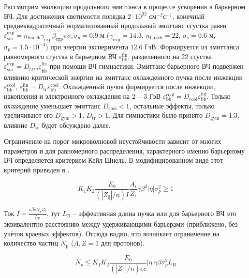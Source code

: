 \par Рассмотрим эволюцию продольного эмиттанса в процессе ускорения в барьерном ВЧ. 
Для достижения светимости порядка $2 \cdot 10^{32}$ см$^{-2}$с$^{-1}$, конечный среднеквадратичный нормализованный продольный эмиттанс сгустка равен $\varepsilon_{\textrm{sin}}^{\textrm{exp}}=n_{\textrm{bunch}}\gamma_{\textrm{exp}}\beta_{\textrm{exp}}\pi\sigma_s\sigma_p=0.9$ м ($\gamma_{\textrm{exp}}=14.3$, $n_{\textrm{bunch}}=22$, $\sigma_s=0.6$ м, $\sigma_p=1.5\cdot 10^{-3}$) при энергии эксперимента $12.6$ ГэВ. 
Формируется из эмиттанса равномерного сгустка в барьерном ВЧ $\varepsilon_{\textrm{bb}}^{\textrm{fin}}$, разделенного на $22$ сгустка $\varepsilon_{\textrm{sin}}^{\textrm{exp}}={D_{\textrm{gym}}\varepsilon}_{\textrm{bb}}^{\textrm{fin}}$ при помощи ВЧ гимнастики. 
Эмиттанс барьерного ВЧ подвержен влиянию критической энергии на эмиттанс охлажденного пучка после инжекции $\varepsilon_{\textrm{bb}}^{\textrm{cool}}$, $\varepsilon_{\textrm{bb}}^{\textrm{fin}}=D_{\textrm{tr}}\varepsilon_{\textrm{bb}}^{\textrm{cool}}$. 
Охлажденный пучок формируется после инжекции, накопления и электронного охлаждения на $2-3$ ГэВ $ \varepsilon_{\textrm{bb}}^{\textrm{cool}}=D_{\textrm{cool}}\varepsilon_{\textrm{bb}}^{\textrm{inj}}$. 
Только охлаждение уменьшает эмиттанс $D_{\textrm{cool}}<1$, остальные эффекты, только увеличивают его $D_{\textrm{gym}}>1$, $D_{\textrm{tr}}>1$. 
Для гимнастики было принято $D_{\textrm{gym}}=1.3$, влияние $D_{\textrm{tr}}$ будет обсуждено далее.
	
\par Ограничение на порог микроволновой неустойчивости зависит от многих параметров и для равномерного распределения, характерного именно барьерному ВЧ определяется критерием Кейл-Шнель. В модифицированном виде этот критерий приведен в \cite{zinkevich}.

\begin{equation}
K_1K_2\frac{E_0}{\left(\left|Z_\parallel\right|/n\right)I}\frac{A_i}{Z_i}\gamma\beta^2|\eta|\sigma_p^2\geq1
\label{eq:microwave_instability}
\end{equation}

\noindent Ток $I=\frac{{e\beta cN}_pZ_i}{L_{\textrm{B}}}$, тут $L_{\textrm{B}}$ -- эффективная длина пучка или для барьерного ВЧ это эквивалентно расстоянию между удерживающими барьерами (приближено, без учётов краевых эффектов). Отсюда видно, что возникает ограничение на количество частиц $N_{\textrm{p}}$ ($A, Z=1$ для протонов).

\begin{equation}
N_p\le K_1K_2\frac{E_0}{\left(\left|Z_\parallel\right|/n\right)ec}\left|\eta\right|\gamma\beta\sigma_p^2L_{\textrm{B}}
\label{eq:microwave_instability_1}
\end{equation}

